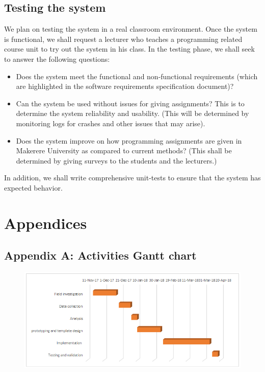 \documentclass[12pt]{article}
\begin{document}
	\subsection{Testing the system}
	We plan on testing the system in a real classroom environment. Once the system is functional, we shall request a lecturer who teaches a programming related course unit to try out the system in his class. In the testing phase, we shall seek to answer the following questions:
	\begin{itemize}
		\item Does the system meet the functional and non-functional requirements (which are highlighted in the software requirements specification document)?
		\item Can the system be used without issues for giving assignments? This is to determine the system reliability and usability. (This will be determined by monitoring logs for crashes and other issues that may arise).
		\item Does the system improve on how programming assignments are given in Makerere University as compared to current methods? (This shall be determined by giving surveys to the students and the lecturers.)
	\end{itemize}
	
	In addition, we shall write comprehensive unit-tests to ensure that the system has expected behavior.

\newpage


\newpage
\section{Appendices}
\subsection{Appendix A: Activities Gantt chart}
\begin{figure}[h]
	\begin{center} \includegraphics[width=1\linewidth]{gantt.png} \end{center}
\end{figure}
\end{document}
